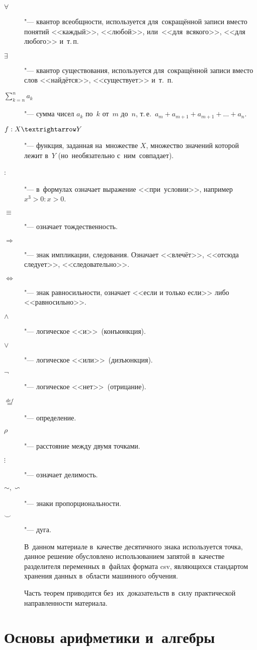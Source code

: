 \documentclass[]{scrartcl}
\begin{document}
\begin{description}
	\item[$\forall$] "--- квантор всеобщности, используется для~сокращённой записи вместо понятий <<каждый>>, <<любой>>, или~<<для~всякого>>, <<для любого>> и~т.\,п.
	\item[$\exists$] "--- квантор существования, используется для~сокращённой записи вместо слов <<найдётся>>, <<существует>> и~т.~п.
	\item[$\sum \limits_{k=n}^{n} a_k$] "--- сумма чисел $a_k$ по~$k$ от~$m$ до~$n$, т.\,е.~$a_m + a_{m+1}+a_{m+1}+\ldots+a_n$.
	\item[$f:X \textrightarrow Y$] "--- функция, заданная на~множестве $X$, множество значений которой лежит в~$Y$ (но~необязательно с~ним~совпадает).	
	\item[:] "--- в~формулах означает выражение <<при~условии>>, например $x^3>0:x>0$.
	\item[$\equiv$] "--- означает тождественность.
	\item[$\Rightarrow$] "--- знак импликации, следования. Означает <<влечёт>>, <<отсюда следует>>, <<следовательно>>.
	\item[$\Leftrightarrow$] "--- знак равносильности, означает <<если и только если>> либо <<равносильно>>.
	\item[$\wedge$] "--- логическое <<и>>~(конъюнкция).
	\item[$\vee$] "--- логическое <<или>>~(дизъюнкция).
	\item[$\neg$] "--- логическое <<нет>>~(отрицание).
	\item[$\stackrel{def}{=}$] "--- определение.
	\item[$\rho$] "--- расстояние между двумя точками.
	\item[$\vdots$] "--- означает делимость.
	\item[$\sim, \backsim$] "--- знаки пропорциональности.
	\item[$\smile$] "--- дуга.

В~данном материале в~качестве десятичного знака используется точка, данное решение обусловлено использованием запятой в~качестве разделителя переменных в~файлах формата csv, являющихся стандартом хранения данных в~области машинного обучения.

Часть теорем приводится без~их~доказательств в~силу практической направленности материала.	
	
\end{description}

\section{Основы арифметики и~алгебры}
\end{document}
